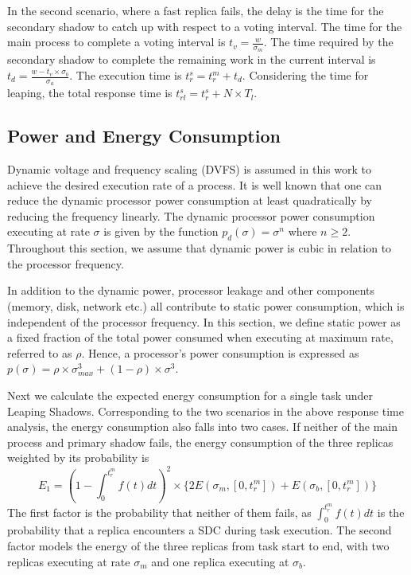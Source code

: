 In the second scenario, 
where a fast replica fails, the delay is the time for the secondary shadow to catch up with respect to a voting interval. The time for the main process to complete a voting interval is $t_v = \frac{w}{\sigma_m}$. The time required by the secondary shadow to complete the remaining work in the current interval is $t_d = \frac{w - t_v\times \sigma_b}{\sigma_a}$. The execution time is $t_r^s = t_r^m + t_d$. Considering the time for leaping, the total response time is $t_{rl}^s=t_r^s + N \times T_l$.


\subsection{Power and Energy Consumption}

Dynamic voltage and frequency scaling
(DVFS) is assumed in this work to achieve the desired execution rate of a process. It
is well known that one can reduce the dynamic processor power consumption at
least quadratically by reducing the frequency linearly. The
dynamic processor power consumption executing at rate
$\sigma$ is given by the function $p_d(\sigma)=\sigma^n$ where $n \ge
2$. Throughout this section, we assume that dynamic power is cubic in relation to the processor frequency.

In addition to the dynamic power, processor leakage and other components
(memory, disk, network etc.) all contribute to static power
consumption, which is independent of the processor frequency. In this section, we
define static power as a fixed fraction of the total power consumed
when executing at maximum rate, referred to as $\rho$. Hence, a processor's
power consumption is expressed as
$p(\sigma)=\rho \times \sigma_{max}^3 + (1-\rho)\times \sigma^3$.

Next we calculate the expected energy consumption for a single task under Leaping Shadows. 
Corresponding to the two scenarios in the above response time analysis, the energy consumption also falls into two cases. 
If neither of the main process and primary shadow fails, the energy consumption of the three replicas weighted by its probability is
\begin{equation}
E_1 =  (1 - \int_{0}^{t_r^m} f(t)dt)^2  \times 
       \{2E(\sigma_m, [0, t_r^m])+E(\sigma_b, [0, t_r^m])\}
\end{equation}
The first factor is the probability that neither of them fails, as $\int_{0}^{t_r^m} f(t)dt$ is the probability that a replica encounters a SDC during task execution. The second factor models the energy of the three replicas from task start to end, with two replicas executing at rate $\sigma_m$ and one replica executing at $\sigma_b$.

